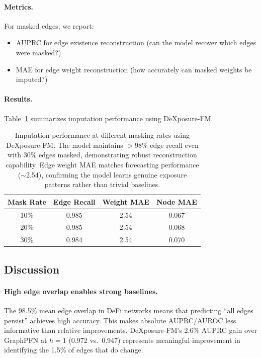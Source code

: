 \paragraph{Metrics.}
For masked edges, we report:
\begin{itemize}
  \item AUPRC for edge existence reconstruction (can the model recover which edges were masked?)
  \item MAE for edge weight reconstruction (how accurately can masked weights be imputed?)
\end{itemize}

\paragraph{Results.}
Table~\ref{tab:imputation-results} summarizes imputation performance using DeXposure-FM.

\begin{table}[t]
\centering
\small
\begin{tabular}{cccc}
\hline
\textbf{Mask Rate} & \textbf{Edge Recall} & \textbf{Weight MAE} & \textbf{Node MAE} \\
\hline
10\% & 0.985 & 2.54 & 0.067 \\
20\% & 0.985 & 2.54 & 0.068 \\
30\% & 0.984 & 2.54 & 0.070 \\
\hline
\end{tabular}
\caption{Imputation performance at different masking rates using DeXposure-FM. The model maintains $>$98\% edge recall even with 30\% edges masked, demonstrating robust reconstruction capability. Edge weight MAE matches forecasting performance ($\sim$2.54), confirming the model learns genuine exposure patterns rather than trivial baselines.}
\label{tab:imputation-results}
\end{table}

\subsection{Discussion}
\label{subsec:discussion}

\paragraph{High edge overlap enables strong baselines.}
The 98.5\% mean edge overlap in DeFi networks means that predicting ``all edges persist'' achieves high accuracy. This makes absolute AUPRC/AUROC less informative than relative improvements. DeXposure-FM's 2.6\% AUPRC gain over GraphPFN at $h=1$ (0.972 vs.\ 0.947) represents meaningful improvement in identifying the 1.5\% of edges that do change.

